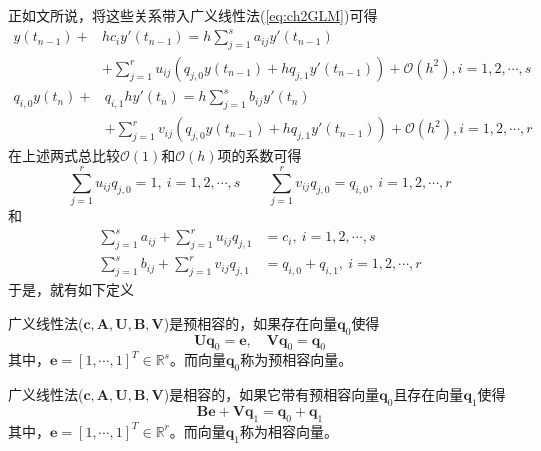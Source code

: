 正如文所说，将这些关系带入广义线性法(\ref{eq:ch2GLM})可得
\begin{equation}
\begin{aligned}
y(t_{n-1})+&hc_iy'(t_{n-1})=h\sum_{j=1}^{s}a_{ij}y'(t_{n-1})\\
&+\sum_{j=1}^{r}u_{ij}\left(q_{j,0}y(t_{n-1})+hq_{j,1}y'(t_{n-1})\right)+\mathcal{O}(h^2),i=1,2,\cdots,s
\end{aligned}
\end{equation}\vspace{-0.5cm}
\begin{equation}
\begin{aligned}
q_{i,0}y(t_{n})+&q_{i,1}hy'(t_{n})=h\sum_{j=1}^{s}b_{ij}y'(t_{n})\\
&+\sum_{j=1}^{r}v_{ij}\left(q_{j,0}y(t_{n-1})+hq_{j,1}y'(t_{n-1})\right)+\mathcal{O}(h^2),i=1,2,\cdots,r
\end{aligned}
\end{equation}
在上述两式总比较$\mathcal{O}(1)$和$\mathcal{O}(h)$项的系数可得
\begin{equation}
\sum_{j=1}^{r}u_{ij}q_{j,0}=1,\ i=1,2,\cdots,s\qquad \sum_{j=1}^{r}v_{ij}q_{j,0}=q_{i,0},\ i = 1,2,\cdots,r
\end{equation}
和
\begin{subequations}
\begin{align}
\sum_{j=1}^{s}a_{ij}+\sum_{j=1}^{r}u_{ij}q_{j,1}&=c_i,\ i=1,2,\cdots,s\\
\sum_{j=1}^{s}b_{ij}+\sum_{j=1}^{r}v_{ij}q_{j,1}&=q_{i,0}+q_{i,1},\ i=1,2,\cdots,r
\end{align}
\end{subequations}
于是，就有如下定义%
\begin{definition}[预相容]
广义线性法($\bm{c},\bm{A},\bm{U},\bm{B},\bm{V}$)是预相容的\cite{Jackiewicz2009a,Burrage1995a,Butcher2016a}，如果存在向量$\bm{q}_0$使得
\begin{equation}
\bm{Uq}_0=\bm{e},\quad \bm{Vq}_0=\bm{q}_0\label{eq:ch2PreConsistent}
\end{equation}
其中，$\bm{e}=[1,\cdots,1]^T\in\mathbb{R}^s$。而向量$\bm{q}_0$称为预相容向量。
\end{definition}%
\begin{definition}[相容]
广义线性法($\bm{c},\bm{A},\bm{U},\bm{B},\bm{V}$)是相容的\cite{Jackiewicz2009a,Burrage1995a,Butcher2016a}，如果它带有预相容向量$\bm{q}_0$且存在向量$\bm{q}_1$使得
\begin{equation}
\bm{Be}+\bm{Vq}_1=\bm{q}_0+\bm{q}_1\label{eq:ch2Consistent}
\end{equation}
其中，$\bm{e}=[1,\cdots,1]^T\in\mathbb{R}^r$。而向量$\bm{q}_1$称为相容向量。
\end{definition}%
